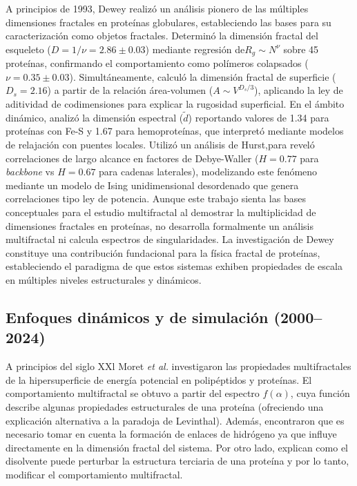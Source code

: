 A principios de 1993, Dewey \cite{Dewey1993} realizó un análisis pionero de las múltiples dimensiones fractales en proteínas globulares, estableciendo las bases para su caracterización como objetos fractales. Determinó la dimensión fractal del esqueleto ($D = 1/\nu = 2.86 \pm 0.03$) mediante regresión de$R_g \sim N^\nu$ sobre 45 proteínas, confirmando el comportamiento como polímeros colapsados ($\nu = 0.35 \pm 0.03$). Simultáneamente, calculó la dimensión fractal de superficie ($D_s = 2.16$) a partir de la relación área-volumen ($A \sim V^{D_s/3}$), aplicando la ley de aditividad de codimensiones para explicar la rugosidad superficial. En el ámbito dinámico, analizó la dimensión espectral ($\tilde{d}$) reportando valores de 1.34 para proteínas con Fe-S y 1.67 para hemoproteínas, que interpretó mediante modelos de relajación con puentes locales. Utilizó un análisis de Hurst,para reveló correlaciones de largo alcance en factores de Debye-Waller ($H = 0.77$ para \textit{backbone} vs $H = 0.67$ para cadenas laterales), modelizando este fenómeno mediante un modelo de Ising unidimensional desordenado que genera correlaciones tipo ley de potencia. Aunque este trabajo sienta las bases conceptuales para el estudio multifractal al demostrar la multiplicidad de dimensiones fractales en proteínas, no desarrolla formalmente un análisis multifractal ni calcula espectros de singularidades. La investigación de Dewey constituye una contribución fundacional para la física fractal de proteínas, estableciendo el paradigma de que estos sistemas exhiben propiedades de escala en múltiples niveles estructurales y dinámicos.


\subsection{Enfoques din\'{a}micos y de simulaci\'{o}n (2000--2024)}


A principios del siglo XXl Moret \textit{et al.}\cite{Moret2001} investigaron las propiedades multifractales de la hipersuperficie de energ\'{i}a potencial en polip\'{e}ptidos y prote\'{i}nas. El comportamiento multifractal se obtuvo a partir del espectro $f(\alpha)$, cuya funci\'{o}n describe algunas propiedades estructurales de una prote\'{i}na (ofreciendo una explicaci\'{o}n alternativa a la paradoja de Levinthal). Adem\'{a}s, encontraron que es necesario tomar en cuenta la formaci\'{o}n de enlaces de hidr\'{o}geno ya que influye directamente en la dimensi\'{o}n fractal del sistema. Por otro lado, explican como el disolvente puede perturbar la estructura terciaria de una prote\'{i}na y por lo tanto, modificar el comportamiento multifractal.

